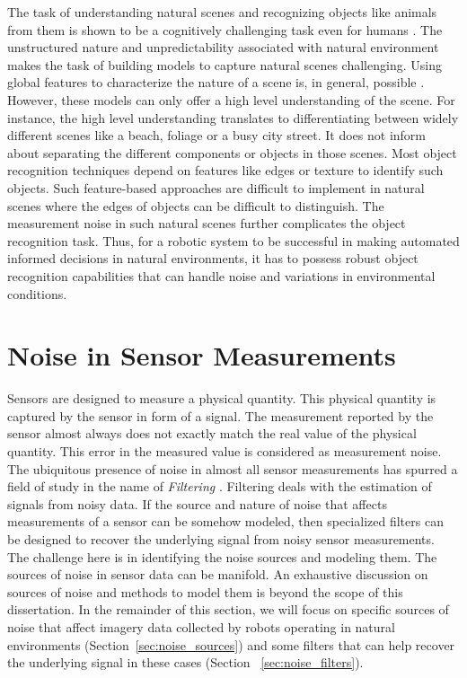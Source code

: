 \documentclass {udthesis}
\begin{document}
The task of understanding natural scenes and recognizing objects like animals from them is shown to be a cognitively challenging task 
even for humans \cite{wichmann}. The unstructured nature and unpredictability associated with natural environment makes the task of 
building models to capture natural scenes challenging.
Using global features to characterize the nature of a scene is, in general, possible \cite{olivia}. However, these models can only offer a high level understanding
of the scene. For instance, the high level understanding translates to differentiating between widely different scenes like a beach, foliage or a busy city street. It does not inform about separating the different components or objects in those scenes. Most object recognition techniques depend on features like edges or texture to identify such objects. Such feature-based approaches are difficult to implement in natural scenes where the edges of objects can be difficult to distinguish.
The measurement noise in such natural scenes further complicates the object recognition task. 
Thus, for a robotic system to be
successful in making automated informed decisions in natural environments, it has to possess robust object recognition capabilities that can handle noise and variations in environmental conditions.


\section{Noise in Sensor Measurements}

Sensors are designed to measure a physical quantity. This physical quantity is captured by the sensor in form of a signal.
The measurement reported by the sensor almost always does not exactly match the real value of the physical quantity.
This error in the measured value is considered as measurement noise.
The ubiquitous presence of noise in almost all sensor measurements has spurred a field of study in the name of 
\emph{Filtering} \cite{haykin}. Filtering deals with the estimation of signals from noisy data. 
If the source and nature of noise that affects measurements of a sensor can be somehow modeled, then specialized
filters can be designed to recover the underlying signal from noisy sensor measurements.
The challenge here is in identifying the noise sources and modeling them. 
The sources of noise in sensor data can be manifold. An exhaustive discussion on sources of noise and methods to model them
is beyond the scope of this dissertation. In the remainder of this section, we will focus on specific sources of noise that affect 
imagery data collected by robots operating in natural environments (Section~\ref{sec:noise_sources}) and some filters that can 
help recover the underlying signal in these cases (Section ~\ref{sec:noise_filters}).
\end{document}
